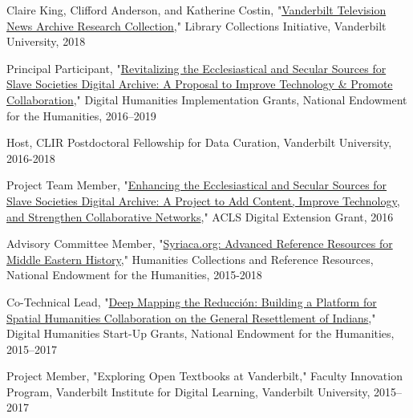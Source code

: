 \documentclass[10pt]{res} %
\begin{document}
\begin{resume}
\begin{hangparas}{.25in}{1}Claire King, Clifford Anderson, and Katherine Costin, "\href{https://news.vanderbilt.edu/2018/05/16/10-faculty-proposals-funded-through-new-library-collections-initiative}{Vanderbilt Television News Archive Research Collection}," Library Collections Initiative, Vanderbilt University, 2018\end{hangparas}

\begin{hangparas}{.25in}{1}Principal Participant, "\href{https://securegrants.neh.gov/publicquery/main.aspx?f=1\&gn=HK-250720-16}{Revitalizing the Ecclesiastical and Secular Sources for Slave Societies Digital Archive: A Proposal to Improve Technology \& Promote Collaboration}," Digital Humanities Implementation Grants, National Endowment for the Humanities, 2016–2019\end{hangparas}

\begin{hangparas}{.25in}{1}Host, CLIR Postdoctoral Fellowship for Data Curation, Vanderbilt University, 2016-2018\end{hangparas}

\begin{hangparas}{.25in}{1}Project Team Member, "\href{http://www.acls.org/research/fellow.aspx?cid=f125fd4b-41a1-e211-b90d-000c29a3451a}{Enhancing the Ecclesiastical and Secular Sources for Slave Societies Digital Archive: A Project to Add Content, Improve Technology, and Strengthen Collaborative Networks}," ACLS Digital Extension Grant, 2016\end{hangparas}

\begin{hangparas}{.25in}{1}Advisory Committee Member, "\href{https://securegrants.neh.gov/PublicQuery/main.aspx?f=1\&gn=PW-228209-15}{Syriaca.org: Advanced Reference Resources for Middle Eastern History}," Humanities Collections and Reference Resources, National Endowment for the Humanities, 2015-2018\end{hangparas}  
\begin{hangparas}{.25in}{1}Co-Technical Lead, "\href{https://securegrants.neh.gov/PublicQuery/main.aspx?f=1\&gn=HD-229071-15}{Deep Mapping the Reducción: Building a Platform for Spatial Humanities Collaboration on the General Resettlement of Indians}," Digital Humanities Start-Up Grants, National Endowment for the Humanities, 2015–2017\end{hangparas} 

\begin{hangparas}{.25in}{1}Project Member, "Exploring Open Textbooks at Vanderbilt," Faculty Innovation Program, Vanderbilt Institute for Digital Learning, Vanderbilt University, 2015–2017\end{hangparas}


\end{resume}
\end{document}
